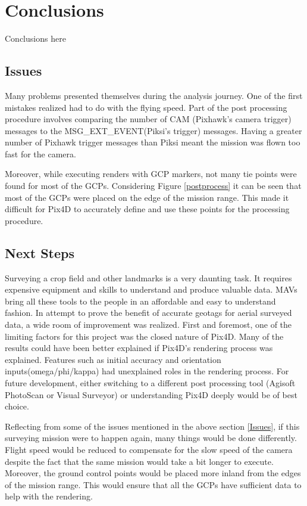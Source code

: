 \documentclass{article}
\begin{document}
\section{Conclusions}
Conclusions here
\subsection{Issues}
Many problems presented themselves during the analysis journey. One of the first mistakes realized
had to do with the flying speed. Part of the post processing procedure involves comparing the number
of CAM (Pixhawk's camera trigger) messages to the MSG\_EXT\_EVENT(Piksi's trigger) messages. Having
a greater number of Pixhawk trigger messages than Piksi meant the mission was flown too fast for the
camera.

Moreover, while executing renders with GCP markers, not many tie points were found for most of the
GCPs. Considering Figure \ref{postprocess} it can be seen that most of the GCPs were placed on the
edge of the mission range. This made it difficult for Pix4D to accurately define and use these
points for the processing procedure.

\subsection{Next Steps}
Surveying a crop field and other landmarks is a very daunting task. It requires expensive equipment
and skills to understand and produce valuable data. MAVs bring all these tools to the people in an
affordable and easy to understand fashion. In attempt to prove the benefit of accurate geotags for
aerial surveyed data, a wide room of improvement was realized. First and foremost, one of the
limiting factors for this project was the closed nature of Pix4D. Many of the results could have
been better explained if Pix4D's rendering process was explained. Features such as initial accuracy
and orientation inputs(omega/phi/kappa) had unexplained roles in the rendering process. For future
development, either switching to a different post processing tool (Agisoft PhotoScan or Visual 
Surveyor) or understanding Pix4D deeply would be of best choice.


Reflecting from some of the issues mentioned in the above section \ref{Issues}, if this surveying
mission were to happen again, many things would be done differently. Flight speed would be reduced
to compensate for the slow speed of the camera despite the fact that the same mission would take a
bit longer to execute. Moreover, the ground control points would be placed more inland from the
edges of the mission range. This would ensure that all the GCPs have sufficient data to help with
the rendering.
\end{document}
